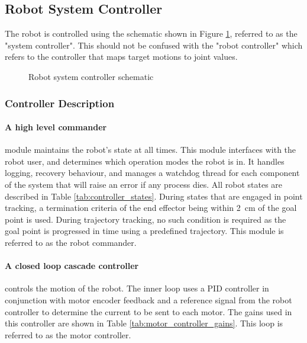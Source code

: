 \subsection{Robot System Controller}
The robot is controlled using the schematic shown in Figure \ref{fig:control_schematic}, referred to as the "system controller". This should not be confused with the "robot controller" which refers to the controller that maps target motions to joint values. 

\begin{figure}[h]
    \centering
    \caption{Robot system controller schematic}
    \label{fig:control_schematic}
\end{figure}

\subsubsection{Controller Description}
\paragraph{A high level commander} module maintains the robot's state at all times. This module interfaces with the robot user, and determines which operation modes the robot is in. It handles logging, recovery behaviour, and manages a watchdog thread for each component of the system that will raise an error if any process dies. All robot states are described in Table \ref{tab:controller_states}. During states that are engaged in point tracking, a termination criteria of the end effector being within \SI{2}{cm} of the goal point is used. During trajectory tracking, no such condition is required as the goal point is progressed in time using a predefined trajectory. This module is referred to as the robot commander. 

\paragraph{A closed loop cascade controller} controls the motion of the robot. The inner loop uses a PID controller in conjunction with motor encoder feedback and a reference signal from the robot controller to determine the current to be sent to each motor. The gains used in this controller are shown in Table \ref{tab:motor_controller_gains}. This loop is referred to as the motor controller. 

